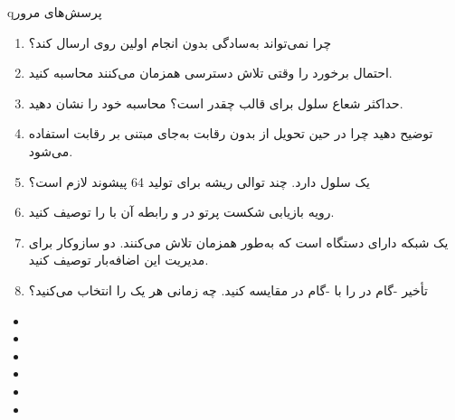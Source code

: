 



\begin{CNbox}[unbreakable]{q}{پرسش‌های مرور}

\begin{enumerate}
\def\labelenumi{\arabic{enumi}.}
\tightlist
\item
  چرا  نمی‌تواند به‌سادگی بدون انجام اولین  روی  ارسال کند؟
\item
  احتمال برخورد را وقتی  تلاش دسترسی همزمان می‌کنند محاسبه کنید.
\item
  حداکثر شعاع سلول برای قالب  چقدر است؟ محاسبه خود را نشان دهید.
\item
  توضیح دهید چرا در حین تحویل از  بدون رقابت به‌جای مبتنی بر رقابت استفاده می‌شود.
\item
  یک سلول  دارد. چند توالی ریشه برای تولید 64 پیشوند لازم است؟
\item
  رویه بازیابی شکست پرتو در  و رابطه آن با  را توصیف کنید.
\item
  یک شبکه  دارای  دستگاه است که به‌طور همزمان تلاش  می‌کنند. دو سازوکار برای مدیریت این اضافه‌بار توصیف کنید.
\item
  تأخیر -گام در  را با -گام در  مقایسه کنید. چه زمانی هر یک را انتخاب می‌کنید؟
\end{enumerate}

\end{CNbox}


\begin{itemize}
\tightlist
\item
\item
\item
\item
\item
\item
\end{itemize}
